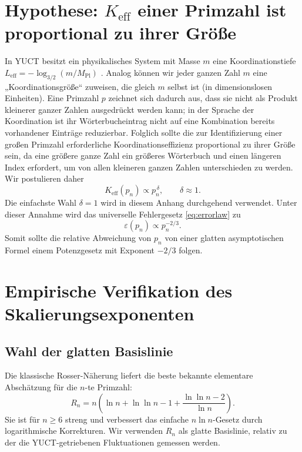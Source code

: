 \documentclass[11pt,a4paper]{article}
\begin{document}
	\section{Hypothese: \(K_{\mathrm{eff}}\) einer Primzahl ist proportional zu ihrer Größe}
	In YUCT besitzt ein physikalisches System mit Masse \(m\) eine Koordinationstiefe \(L_{\mathrm{eff}} = -\log_{3/2}(m/M_{\mathrm{Pl}})\) \cite{YakushevLaw2026}. Analog können wir jeder ganzen Zahl \(m\) eine „Koordinationsgröße“ zuweisen, die gleich \(m\) selbst ist (in dimensionslosen Einheiten). Eine Primzahl \(p\) zeichnet sich dadurch aus, dass sie nicht als Produkt kleinerer ganzer Zahlen ausgedrückt werden kann; in der Sprache der Koordination ist ihr Wörterbucheintrag nicht auf eine Kombination bereits vorhandener Einträge reduzierbar. Folglich sollte die zur Identifizierung einer großen Primzahl erforderliche Koordinationseffizienz proportional zu ihrer Größe sein, da eine größere ganze Zahl ein größeres Wörterbuch und einen längeren Index erfordert, um von allen kleineren ganzen Zahlen unterschieden zu werden. Wir postulieren daher
	\begin{equation}\label{eq:Keff-prime}
		K_{\mathrm{eff}}(p_n) \propto p_n^{\,\delta}, \qquad \delta \approx 1.
	\end{equation}
	Die einfachste Wahl \(\delta = 1\) wird in diesem Anhang durchgehend verwendet. Unter dieser Annahme wird das universelle Fehlergesetz \eqref{eq:errorlaw} zu
	\begin{equation}\label{eq:error-prime}
		\varepsilon(p_n) \propto p_n^{-2/3}.
	\end{equation}
	Somit sollte die relative Abweichung von \(p_n\) von einer glatten asymptotischen Formel einem Potenzgesetz mit Exponent \(-2/3\) folgen.
	
	\section{Empirische Verifikation des Skalierungsexponenten}
	\subsection{Wahl der glatten Basislinie}
	Die klassische Rosser-Näherung \cite{Rosser1941} liefert die beste bekannte elementare Abschätzung für die \(n\)-te Primzahl:
	\begin{equation}\label{eq:rosser}
		R_n = n\!\left(\ln n + \ln\ln n - 1 + \frac{\ln\ln n - 2}{\ln n}\right).
	\end{equation}
	Sie ist für \(n \ge 6\) streng und verbessert das einfache \(n\ln n\)-Gesetz durch logarithmische Korrekturen. Wir verwenden \(R_n\) als glatte Basislinie, relativ zu der die YUCT-getriebenen Fluktuationen gemessen werden.
	
\end{document}
